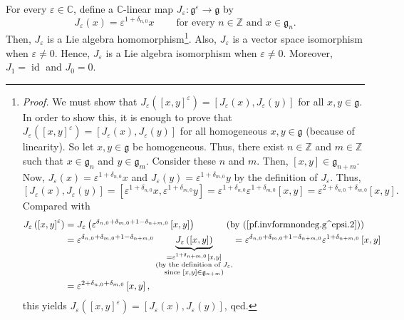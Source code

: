 \documentclass
[numbers=enddot,12pt,final,onecolumn,german,notitlepage]{scrartcl}%
\theoremstyle{definition}
\begin{document}
For every $\varepsilon\in\mathbb{C}$, define a $\mathbb{C}$-linear map
$J_{\varepsilon}:\mathfrak{g}^{\varepsilon}\rightarrow\mathfrak{g}$ by%
\[
J_{\varepsilon}\left(  x\right)  =\varepsilon^{1+\delta_{n,0}}%
x\ \ \ \ \ \ \ \ \ \ \text{for every }n\in\mathbb{Z}\text{ and }%
x\in\mathfrak{g}_{n}.
\]
Then, $J_{\varepsilon}$ is a Lie algebra homomorphism\footnote{\textit{Proof.}
We must show that $J_{\varepsilon}\left(  \left[  x,y\right]  ^{\varepsilon
}\right)  =\left[  J_{\varepsilon}\left(  x\right)  ,J_{\varepsilon}\left(
y\right)  \right]  $ for all $x,y\in\mathfrak{g}$. In order to show this, it
is enough to prove that $J_{\varepsilon}\left(  \left[  x,y\right]
^{\varepsilon}\right)  =\left[  J_{\varepsilon}\left(  x\right)
,J_{\varepsilon}\left(  y\right)  \right]  $ for all homogeneous
$x,y\in\mathfrak{g}$ (because of linearity). So let $x,y\in\mathfrak{g}$ be
homogeneous. Thus, there exist $n\in\mathbb{Z}$ and $m\in\mathbb{Z}$ such that
$x\in\mathfrak{g}_{n}$ and $y\in\mathfrak{g}_{m}$. Consider these $n$ and $m$.
Then, $\left[  x,y\right]  \in\mathfrak{g}_{n+m}$. Now, $J_{\varepsilon
}\left(  x\right)  =\varepsilon^{1+\delta_{n,0}}x$ and $J_{\varepsilon}\left(
y\right)  =\varepsilon^{1+\delta_{m,0}}y$ by the definition of $J_{\varepsilon
}$. Thus,%
\[
\left[  J_{\varepsilon}\left(  x\right)  ,J_{\varepsilon}\left(  y\right)
\right]  =\left[  \varepsilon^{1+\delta_{n,0}}x,\varepsilon^{1+\delta_{m,0}%
}y\right]  =\varepsilon^{1+\delta_{n,0}}\varepsilon^{1+\delta_{m,0}}\left[
x,y\right]  =\varepsilon^{2+\delta_{n,0}+\delta_{m,0}}\left[  x,y\right]  .
\]
Compared with%
\begin{align*}
J_{\varepsilon}\left(  \left[  x,y\right]  ^{\varepsilon}\right)   &
=J_{\varepsilon}\left(  \varepsilon^{\delta_{n,0}+\delta_{m,0}+1-\delta
_{n+m,0}}\left[  x,y\right]  \right)  \ \ \ \ \ \ \ \ \ \ \left(  \text{by
(\ref{pf.invformnondeg.g^epsi.2})}\right) \\
&  =\varepsilon^{\delta_{n,0}+\delta_{m,0}+1-\delta_{n+m,0}}%
\underbrace{J_{\varepsilon}\left(  \left[  x,y\right]  \right)  }%
_{\substack{=\varepsilon^{1+\delta_{n+m,0}}\left[  x,y\right]  \\\text{(by the
definition of }J_{\varepsilon}\text{,}\\\text{since }\left[  x,y\right]
\in\mathfrak{g}_{n+m}\text{)}}}=\varepsilon^{\delta_{n,0}+\delta
_{m,0}+1-\delta_{n+m,0}}\varepsilon^{1+\delta_{n+m,0}}\left[  x,y\right] \\
&  =\varepsilon^{2+\delta_{n,0}+\delta_{m,0}}\left[  x,y\right]  ,
\end{align*}
this yields $J_{\varepsilon}\left(  \left[  x,y\right]  ^{\varepsilon}\right)
=\left[  J_{\varepsilon}\left(  x\right)  ,J_{\varepsilon}\left(  y\right)
\right]  $, qed.}. Also, $J_{\varepsilon}$ is a vector space isomorphism when
$\varepsilon\neq0$. Hence, $J_{\varepsilon}$ is a Lie algebra isomorphism when
$\varepsilon\neq0$. Moreover, $J_{1}=\operatorname*{id}$ and $J_{0}=0$.
\end{document}
